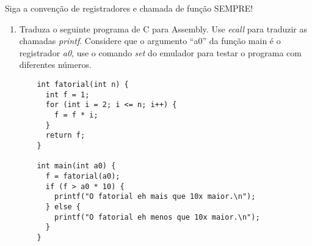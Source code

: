 \documentclass{article}
\begin{document}
Siga a convenção de registradores e chamada de função SEMPRE!

\begin{enumerate}
  \item Traduza o seguinte programa de C para Assembly. Use \textit{ecall} para
  traduzir as chamadas \textit{printf}. Considere que o argumento ``a0'' da
  função main é o registrador \textit{a0}, use o comando \textit{set} do
  emulador para testar o programa com diferentes números.

  \begin{verbatim}
    int fatorial(int n) {
      int f = 1;
      for (int i = 2; i <= n; i++) {
        f = f * i;
      }
      return f;
    }

    int main(int a0) {
      f = fatorial(a0);
      if (f > a0 * 10) {
        printf("O fatorial eh mais que 10x maior.\n");
      } else {
        printf("O fatorial eh menos que 10x maior.\n");
      }
    }
  \end{verbatim}
\end{enumerate}
\end{document}

